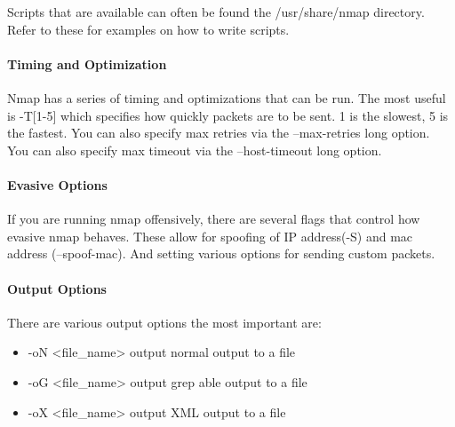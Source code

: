 Scripts that are available can often be found the /usr/share/nmap directory.  Refer to these for examples on how to write scripts.

\paragraph{Timing and Optimization}
Nmap has a series of timing and optimizations that can be run.
The most useful is -T[1-5] which specifies how quickly packets are to be sent.
1 is the slowest, 5 is the fastest.
You can also specify max retries via the --max-retries long option.
You can also specify max timeout via the --host-timeout long option.

\paragraph{Evasive Options}
If you are running nmap offensively, there are several flags that control how evasive nmap behaves.
These allow for spoofing of IP address(-S) and mac address (--spoof-mac).
And setting various options for sending custom packets.

\paragraph{Output Options}
There are various output options the most important are:
\begin{itemize}
	\item -oN <file\_name> output normal output to a file
	\item -oG <file\_name> output grep able output to a file
	\item -oX <file\_name> output XML output to a file
\end{itemize}

